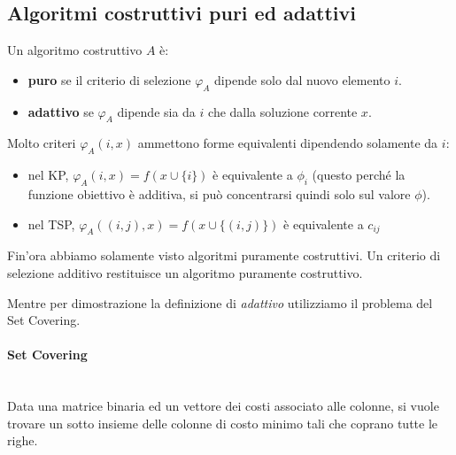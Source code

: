 \documentclass{article}
\begin{document}
\subsection{Algoritmi costruttivi puri ed adattivi}
Un algoritmo costruttivo $A$ è:
\begin{itemize}
    \item \textbf{puro} se il criterio di selezione $\varphi_A$ dipende solo dal nuovo elemento $i$.
    \item \textbf{adattivo} se $\varphi_A$ dipende sia da $i$ che dalla soluzione corrente $x$.
\end{itemize}
Molto criteri $\varphi_A (i,x)$ ammettono forme equivalenti dipendendo solamente da $i$:
\begin{itemize}
    \item nel KP, $\varphi_A(i,x) = f(x\cup\{i\})$ è equivalente a $\phi_i$ (questo perché la funzione obiettivo
          è additiva, si può concentrarsi quindi solo sul valore $\phi$).
    \item nel TSP, $\varphi_A((i,j),x)=f(x\cup\{(i,j)\})$ è equivalente a $c_{ij}$
\end{itemize}
Fin'ora abbiamo solamente visto algoritmi puramente costruttivi. Un criterio di selezione additivo
restituisce un algoritmo puramente costruttivo.

Mentre per dimostrazione la definizione di \textit{adattivo} utilizziamo il problema del Set Covering.

\paragraph{Set Covering}\mbox{}\\
Data una matrice binaria ed un vettore dei costi associato alle colonne, si vuole trovare un sotto insieme
delle colonne di costo minimo tali che coprano tutte le righe.
\end{document}
